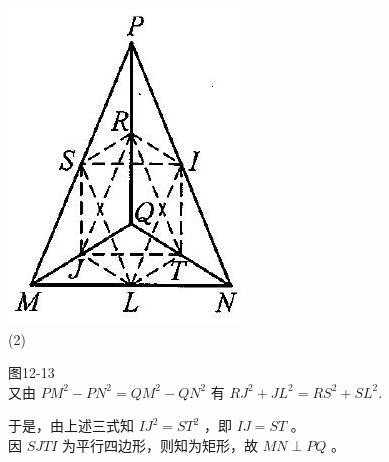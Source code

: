 \documentclass[10pt]{article}
\begin{document}
\includegraphics[max width=\textwidth, center]{2024_10_30_2c8f45efd4a519b08e1ag-117}\\
(2)

图12-13\\
又由 $P M^{2}-P N^{2}=Q M^{2}-Q N^{2}$ 有 $R J^{2}+J L^{2}=R S^{2}+S L^{2}$.

于是，由上述三式知 $I J^{2}=S T^{2}$ ，即 $I J=S T$ 。\\
因 $S J T I$ 为平行四边形，则知为矩形，故 $M N \perp P Q$ 。
\end{document}
